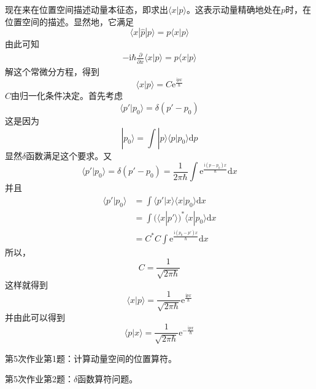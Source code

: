         现在来在位置空间描述动量本征态，即求出$\langle x|p \rangle$。这表示动量精确地处在$p$时，在位置空间的描述。显然地，它满足
        \begin{equation*}
            \langle x|\hat{p}|p\rangle = p\langle x|p \rangle
        \end{equation*}
        由此可知 
        \begin{align*}
            -\mathrm{i}\hbar \frac {\partial}{\partial x} \langle x|p \rangle = p \langle x|p \rangle
        \end{align*}
        解这个常微分方程，得到
        \begin{equation*}
            \langle x|p \rangle = C \mathrm{e}^{\frac {\mathrm{i}px}\hbar}
        \end{equation*}
        $C$由归一化条件决定。首先考虑
        \begin{equation*}
            \langle p' | p_0 \rangle = \delta (p'-p_0)
        \end{equation*}
        这是因为
        \begin{equation*}
            |p_0 \rangle = \int |p\rangle \langle p|p_0\rangle \mathrm{d}p
        \end{equation*}
        显然$\delta$函数满足这个要求。又
        \begin{equation*}
            \langle p' | p_0 \rangle = \delta (p'-p_0) = \frac 1{2\pi\hbar} \int \mathrm{e}^{\frac {\mathrm{i}(p-p_0)x}{\hbar}} \mathrm{d}x
        \end{equation*}
        并且
        \begin{align*}
            \langle p'|p_0 \rangle &= \int \langle p'|x\rangle \langle x|p_0 \rangle \mathrm{d}x\\
            &= \int (\langle x|p' \rangle)^* \langle x|p_0 \rangle \mathrm{d}x\\
            &= C^*C\int \mathrm{e}^{\frac {\mathrm{i}(p_0-p')x}{\hbar}} \mathrm{d}x
        \end{align*}
        所以， 
        \begin{equation*}
            C = \frac 1{\sqrt{2\pi\hbar}}
        \end{equation*}
        这样就得到 
        \begin{equation*}
            \langle x|p \rangle = \frac 1{\sqrt{2\pi\hbar}} \mathrm{e}^{\frac {\mathrm{i}px}{\hbar}}
        \end{equation*}
        并由此可以得到
        \begin{equation*}
            \langle p|x \rangle = \frac 1{\sqrt{2\pi\hbar}} \mathrm{e}^{-\frac {\mathrm{i}px}{\hbar}}
        \end{equation*}
        \begin{asg}
            第5次作业第1题：计算动量空间的位置算符。
        \end{asg}
        \begin{asg}
            第5次作业第2题：$\delta$函数算符问题。
        \end{asg}

